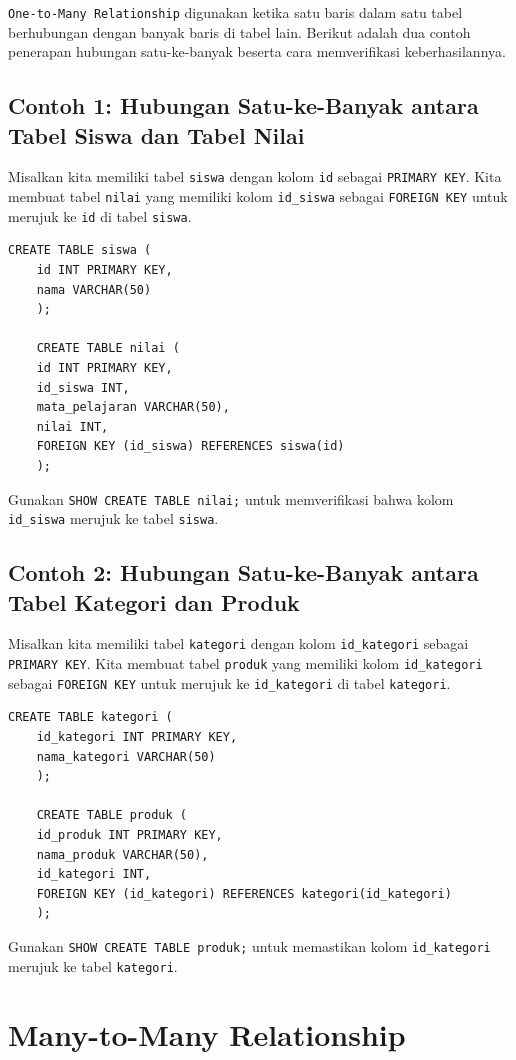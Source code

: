 \texttt{One-to-Many Relationship} digunakan ketika satu baris dalam satu tabel berhubungan dengan banyak baris di tabel lain. Berikut adalah dua contoh penerapan hubungan satu-ke-banyak beserta cara memverifikasi keberhasilannya.

\subsection*{Contoh 1: Hubungan Satu-ke-Banyak antara Tabel Siswa dan Tabel Nilai}
Misalkan kita memiliki tabel \texttt{siswa} dengan kolom \texttt{id} sebagai \texttt{PRIMARY KEY}. Kita membuat tabel \texttt{nilai} yang memiliki kolom \texttt{id\_siswa} sebagai \texttt{FOREIGN KEY} untuk merujuk ke \texttt{id} di tabel \texttt{siswa}.

\begin{lstlisting}[style=sql]
	CREATE TABLE siswa (
	id INT PRIMARY KEY,
	nama VARCHAR(50)
	);
	
	CREATE TABLE nilai (
	id INT PRIMARY KEY,
	id_siswa INT,
	mata_pelajaran VARCHAR(50),
	nilai INT,
	FOREIGN KEY (id_siswa) REFERENCES siswa(id)
	);
\end{lstlisting}

Gunakan \texttt{SHOW CREATE TABLE nilai;} untuk memverifikasi bahwa kolom \texttt{id\_siswa} merujuk ke tabel \texttt{siswa}.

\subsection*{Contoh 2: Hubungan Satu-ke-Banyak antara Tabel Kategori dan Produk}
Misalkan kita memiliki tabel \texttt{kategori} dengan kolom \texttt{id\_kategori} sebagai \texttt{PRIMARY KEY}. Kita membuat tabel \texttt{produk} yang memiliki kolom \texttt{id\_kategori} sebagai \texttt{FOREIGN KEY} untuk merujuk ke \texttt{id\_kategori} di tabel \texttt{kategori}.

\begin{lstlisting}[style=sql]
	CREATE TABLE kategori (
	id_kategori INT PRIMARY KEY,
	nama_kategori VARCHAR(50)
	);
	
	CREATE TABLE produk (
	id_produk INT PRIMARY KEY,
	nama_produk VARCHAR(50),
	id_kategori INT,
	FOREIGN KEY (id_kategori) REFERENCES kategori(id_kategori)
	);
\end{lstlisting}

Gunakan \texttt{SHOW CREATE TABLE produk;} untuk memastikan kolom \texttt{id\_kategori} merujuk ke tabel \texttt{kategori}.

\section{Many-to-Many Relationship}

